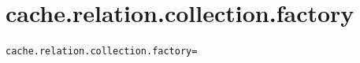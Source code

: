 \section{cache.relation.collection.factory}
\label{configuration:CacheRelationCollectionFactory}
\ClearAPI
\TODO%
\begin{lstlisting}[style=Props,caption={Usage example for \textit{cache.relation.collection.factory}}]
cache.relation.collection.factory=
\end{lstlisting}
